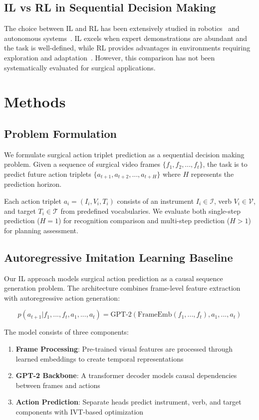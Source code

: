 \documentclass[runningheads]{llncs}
\begin{document}
\subsection{IL vs RL in Sequential Decision Making}
The choice between IL and RL has been extensively studied in robotics~\cite{ref_robotics_il_rl} and autonomous systems~\cite{ref_autonomous_il_rl}. IL excels when expert demonstrations are abundant and the task is well-defined, while RL provides advantages in environments requiring exploration and adaptation~\cite{ref_il_rl_comparison}. However, this comparison has not been systematically evaluated for surgical applications.

\section{Methods}

\subsection{Problem Formulation}

We formulate surgical action triplet prediction as a sequential decision making problem. Given a sequence of surgical video frames $\{f_1, f_2, ..., f_t\}$, the task is to predict future action triplets $\{a_{t+1}, a_{t+2}, ..., a_{t+H}\}$ where $H$ represents the prediction horizon.

Each action triplet $a_i = (I_i, V_i, T_i)$ consists of an instrument $I_i \in \mathcal{I}$, verb $V_i \in \mathcal{V}$, and target $T_i \in \mathcal{T}$ from predefined vocabularies. We evaluate both single-step prediction ($H=1$) for recognition comparison and multi-step prediction ($H>1$) for planning assessment.

\subsection{Autoregressive Imitation Learning Baseline}

Our IL approach models surgical action prediction as a causal sequence generation problem. The architecture combines frame-level feature extraction with autoregressive action generation:

\begin{equation}
p(a_{t+1}|f_1, ..., f_t, a_1, ..., a_t) = \text{GPT-2}(\text{FrameEmb}(f_1, ..., f_t), a_1, ..., a_t)
\end{equation}

The model consists of three components:
\begin{enumerate}
\item \textbf{Frame Processing}: Pre-trained visual features are processed through learned embeddings to create temporal representations
\item \textbf{GPT-2 Backbone}: A transformer decoder models causal dependencies between frames and actions
\item \textbf{Action Prediction}: Separate heads predict instrument, verb, and target components with IVT-based optimization
\end{enumerate}
\end{document}
